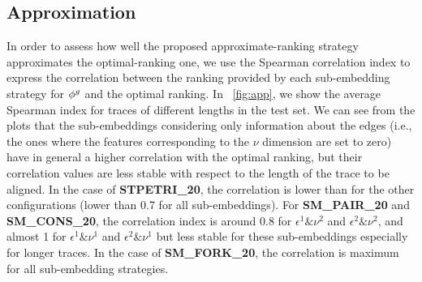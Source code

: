 \subsection{Approximation}\label{subsec:apprp}
In order to assess how well the proposed approximate-ranking strategy approximates the optimal-ranking one, we use the Spearman correlation index \cite{SCI} to express the correlation between the ranking provided by each sub-embedding strategy for $\phi^{g}$  and the optimal ranking. In \figurename~\ref{fig:app}, we show the average Spearman index for traces of different lengths in the test set. We can see from the plots that the sub-embeddings considering only information about the edges (i.e., the ones where the features corresponding to the $\nu$ dimension are set to zero) have in general a higher correlation with the optimal ranking, but their correlation values are less stable with respect to the length of the trace to be aligned. In the case of \textbf{STPETRI\_20}, the correlation is lower than for the other configurations (lower than 0.7 for all sub-embeddings). For \textbf{SM\_PAIR\_20} and \textbf{SM\_CONS\_20}, the correlation index is around 0.8 for $\epsilon^1\&\nu^2$ and $\epsilon^2\&\nu^2$, and almost 1 for $\epsilon^1\&\nu^1$ and $\epsilon^2\&\nu^1$ but less stable for these sub-embeddings especially for longer traces. In the case of \textbf{SM\_FORK\_20}, the correlation is maximum for all sub-embedding strategies.


